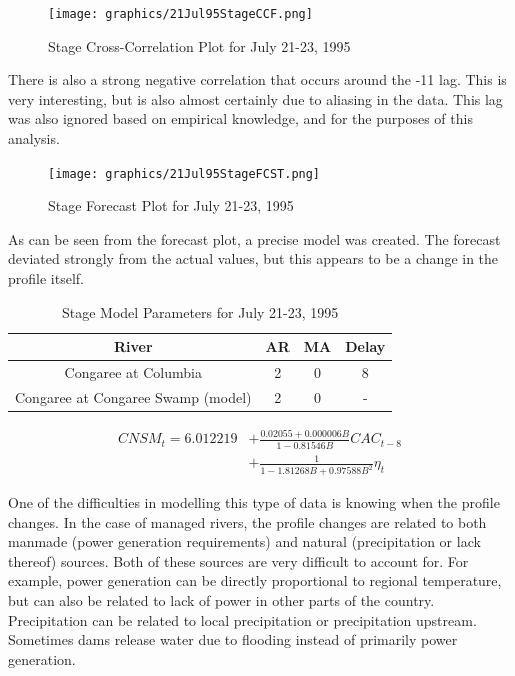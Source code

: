 \documentclass[12pt]{report}
\begin{document}
\begin{figure}[h]
\centering\texttt{[image: graphics/21Jul95StageCCF.png]}
\centering\caption{Stage Cross-Correlation Plot for July 21-23,
1995}\label{fig:jul21stageccf}
\end{figure}

There is also a strong negative correlation that occurs around the
-11 lag.  This is very interesting, but is also almost certainly
due to aliasing in the data.  This lag was also ignored based on
empirical knowledge, and for the purposes of this analysis.
 \clearpage

\begin{figure}[h]
\centering\texttt{[image: graphics/21Jul95StageFCST.png]}
\centering\caption{Stage Forecast Plot for July 21-23, 1995}
\end{figure}

As can be seen from the forecast plot, a precise model was
created. The forecast deviated strongly from the actual values,
but this appears to be a change in the profile itself.

\begin{table}[h]
\begin{centering}\begin{tabular}{|c|c|c|c|}
\hline \textbf{River} & \textbf{AR} & \textbf{MA} & \textbf{Delay} \\
\hline Congaree at Columbia & 2 & 0 & 8 \\
Congaree at Congaree Swamp (model) & 2 & 0 & - \\
\hline
\end{tabular}\caption{Stage Model Parameters for July 21-23, 1995}
\end{centering}\end{table}


\begin{equation}\begin{split}
\label{eq:21jul3stagemodel}
CNSM_t=6.012219&+\frac{0.02055+0.000006B
}{1-0.81546B}CAC_{t-8}\\
&+\frac{1}{1-1.81268B+ 0.97588B^2}\eta_t
\end{split}
\end{equation}

One of the difficulties in modelling this type of data is knowing
when the profile changes.  In the case of managed rivers, the
profile changes are related to both manmade (power generation
requirements) and natural (precipitation or lack thereof) sources.
Both of these sources are very difficult to account for.  For
example, power generation can be directly proportional to regional
temperature, but can also be related to lack of power in other
parts of the country.  Precipitation can be related to local
precipitation or precipitation upstream.  Sometimes dams release
water due to flooding instead of primarily power generation.
\end{document}
